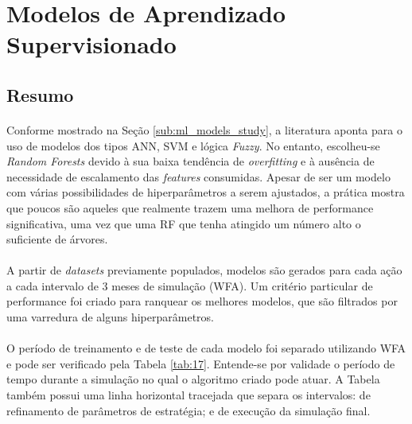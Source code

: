 \FloatBarrier
\section{Modelos de Aprendizado Supervisionado}
\label{sub:super_models}


\FloatBarrier
\subsection{Resumo}

\paragraph{} Conforme mostrado na Seção \ref{sub:ml_models_study}, a literatura aponta para o uso de modelos dos tipos ANN, SVM e lógica \textit{Fuzzy}. No entanto, escolheu-se \textit{Random Forests} devido à sua baixa tendência de \textit{overfitting} e à ausência de necessidade de escalamento das \textit{features} consumidas. Apesar de ser um modelo com várias possibilidades de hiperparâmetros a serem ajustados, a prática mostra que poucos são aqueles que realmente trazem uma melhora de performance significativa, uma vez que uma RF que tenha atingido um número alto o suficiente de árvores.

\paragraph{} A partir de \textit{datasets} previamente populados, modelos são gerados para cada ação a cada intervalo de 3 meses de simulação (WFA). Um critério particular de performance foi criado para ranquear os melhores modelos, que são filtrados por uma varredura de alguns hiperparâmetros.

\paragraph{} O período de treinamento e de teste de cada modelo foi separado utilizando WFA e pode ser verificado pela Tabela \ref{tab:17}. Entende-se por validade o período de tempo durante a simulação no qual o algoritmo criado pode atuar. A Tabela também possui uma linha horizontal tracejada que separa os intervalos: de refinamento de parâmetros de estratégia; e de execução da simulação final.

